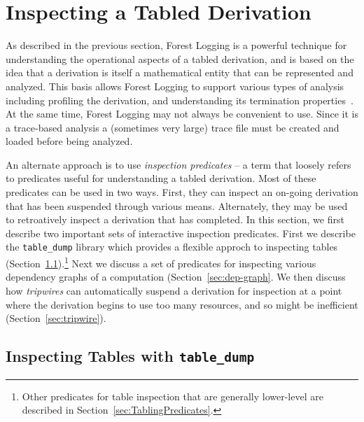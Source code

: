 
\section{Inspecting a Tabled Derivation} \label{sec:suspend-analyze}

As described in the previous section, Forest Logging is a powerful
technique for understanding the operational aspects of a tabled
derivation, and is based on the idea that a derivation is itself a
mathematical entity that can be represented and analyzed.  This basis
allows Forest Logging to support various types of analysis including
profiling the derivation, and understanding its termination
properties~\cite{LiaK13,LiaK13a}.  At the same time, Forest Logging
may not always be convenient to use.  Since it is a trace-based
analysis a (sometimes very large) trace file must be created and
loaded before being analyzed.

An alternate approach is to use {\em inspection predicates} -- a term
that loosely refers to predicates useful for understanding a tabled
derivation.  Most of these predicates can be used in two ways.  First,
they can inspect an on-going derivation that has been suspended
through various means.  Alternately, they may be used to retroatively
inspect a derivation that has completed.  In this section, we first
describe two important sets of interactive inspection predicates.
First we describe the {\tt table\_dump} library which provides a
flexible approch to inspecting tables
(Section~\ref{sec:table-dump}).\footnote{Other predicates for table
  inspection that are generally lower-level are described in
  Section~\ref{sec:TablingPredicates}.}  Next we discuss a set of
predicates for inspecting various dependency graphs of a computation
(Section~\ref{sec:dep-graph}.  We then discuss how {\em tripwires} can
automatically suspend a derivation for inspection at a point where the
derivation begins to use too many resources, and so might be
inefficient (Section~\ref{sec:tripwire}).

\subsection{Inspecting Tables with {\tt table\_dump}} \label{sec:table-dump}

